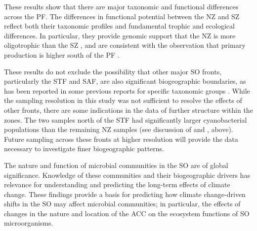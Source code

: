 These results show that there are major taxonomic and functional differences across the \ac{PF}.
The differences in functional potential between the \ac{NZ} and \ac{SZ} reflect both their taxonomic profiles and fundamental trophic and ecological differences.
In particular, they provide genomic support that the \ac{NZ} is more oligotrophic than the \ac{SZ} \cite{Pollard:2002vr,Giovannoni:2005ib,Alonso:2006dj,Lauro:2009gx}, and are consistent with the observation that primary production is higher south of the \ac{PF} \cite{Strutton:2000ta,Williams:2010jy}.

These results do not exclude the possibility that other major \ac{SO} fronts, particularly the \ac{STF} and \ac{SAF}, are also significant biogeographic boundaries, as has been reported in some previous reports for specific taxonomic groups \citep[e.g.][]{Abell:2005ji}.
While the sampling resolution in this study was not sufficient to resolve the effects of other fronts, there are some indications in the data of further structure within the zones.
The two samples north of the \ac{STF} had significantly larger cyanobacterial populations than the remaining \ac{NZ} samples (see discussion of  and , above).
Future sampling across these fronts at higher resolution will provide the data necessary to investigate finer biogeographic patterns.

The nature and function of microbial communities in the \ac{SO} are of global significance.
Knowledge of these communities and their biogeographic drivers has relevance for understanding and predicting the long-term effects of climate change.
These findings provide a basis for predicting how climate change-driven shifts in the \ac{SO} may affect microbial communities; in particular, the effects of changes in the nature and location of the \ac{ACC} on the ecosystem functions of \ac{SO} microorganisms.
